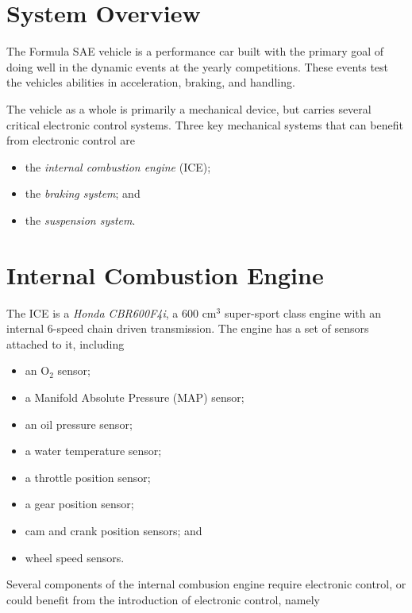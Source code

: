 %
%
%
%

\section{System Overview}

The Formula SAE vehicle is a performance car built with the primary goal of doing well in the 
dynamic events at the yearly competitions. These events test the vehicles abilities in acceleration, 
braking, and handling.

The vehicle as a whole is primarily a mechanical device, but carries several critical electronic 
control systems. Three key mechanical systems that can benefit from electronic control are

\begin{itemize}
\item the \emph{internal combustion engine} (ICE); 
\item the \emph{braking system}; and
\item the \emph{suspension system}.
\end{itemize}

\section{Internal Combustion Engine}

The ICE is a \emph{Honda CBR600F4i}, a 600 cm$^3$ super-sport class engine with an internal 6-speed 
chain driven transmission. The engine has a set of sensors attached to it, including

\begin{itemize}
\item an O$_{2}$ sensor;
\item a Manifold Absolute Pressure (MAP) sensor; 
\item an oil pressure sensor;
\item a water temperature sensor;
\item a throttle position sensor;
\item a gear position sensor;
\item cam and crank position sensors; and
\item wheel speed sensors.
\end{itemize}

Several components of the internal combusion engine require electronic control, or could benefit from 
the introduction of electronic control, namely

